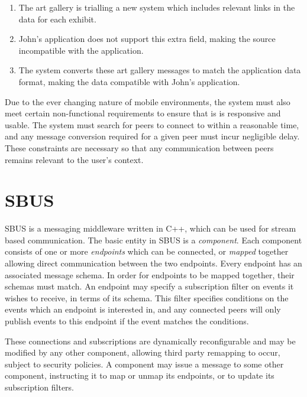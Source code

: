 \documentclass[12pt,twoside,notitlepage]{report}
\begin{document}
\begin{itemize}
\begin{enumerate}
\item The art gallery is trialling a new system which includes relevant links in the data for each exhibit.  

\item John's application does not support this extra field, making the source incompatible with the application.

\item The system converts these art gallery messages to match the application data format, making the data compatible with John's application. 

\end{enumerate}

\end{itemize}

Due to the ever changing nature of mobile environments, the system must also meet certain non-functional requirements to ensure that is is responsive and usable. 
The system must search for peers to connect to within a reasonable time, and any message conversion required for a given peer must incur negligible delay.
These constraints are necessary so that any communication between peers remains relevant to the user's context.

\section{SBUS}

SBUS \cite{ingram2009reconfigurable} is a messaging middleware written in C++, which can be used for stream based communication. 
The basic entity in SBUS is a {\sl component}. 
Each component consists of one or more {\sl endpoints} which can be connected, or {\sl mapped} together allowing direct communication between the two endpoints. 
Every endpoint has an associated message schema. 
In order for endpoints to be mapped together, their schemas must match. 
An endpoint may specify a subscription filter on events it wishes to receive, in terms of its schema. 
This filter specifies conditions on the events which an endpoint is interested in, and any connected peers will only publish events to this endpoint if the event matches the conditions.

These connections and subscriptions are dynamically reconfigurable and may be modified by any other component, allowing third party remapping to occur, subject to security policies. 
A component may issue a message to some other component, instructing it to map or unmap its endpoints, or to update its subscription filters.
\end{document}
